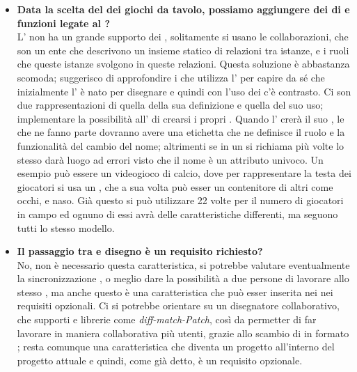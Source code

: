 \begin{itemize}
	   	\item 
	   		\textbf{Data la scelta del  dei giochi da tavolo, possiamo aggiungere dei  di  e funzioni legate al ?} \\
	    	\justifying     		
L' non ha un grande supporto dei , solitamente si usano le collaborazioni, che son un ente che descrivono un insieme statico di relazioni tra istanze, e i ruoli che queste istanze svolgono in queste relazioni. Questa soluzione è abbastanza scomoda; suggerisco di approfondire i  che utilizza l' per capire da sé che inizialmente l' è nato per disegnare  e quindi con l'uso dei  c'è contrasto. 
Ci son due rappresentazioni di  quella della sua definizione e quella del suo uso; implementare la possibilità all' di crearsi i propri . Quando l' crerà il suo , le  che ne fanno parte dovranno avere una etichetta che ne definisce il ruolo e la funzionalità del cambio del nome; altrimenti se in un  si richiama più volte lo stesso  darà luogo ad errori visto che il nome è un attributo univoco. Un esempio può essere un videogioco di calcio, dove per rappresentare la testa dei giocatori si usa un , che a sua volta può esser un contenitore di altri  come occhi, e naso. Già questo  si può utilizzare 22 volte per il numero di giocatori in campo ed ognuno di essi avrà delle caratteristiche differenti, ma seguono tutti lo stesso modello.
\\
	  		   	\item 
	   		\textbf{Il passaggio tra  e disegno è un requisito richiesto?} \\
	    	\justifying     		
No, non è necessario questa caratteristica, si potrebbe valutare eventualmente la sincronizzazione , o meglio dare la possibilità a due persone di lavorare allo stesso  , ma anche questo è una caratteristica che può esser inserita nei nei requisiti opzionali. Ci si potrebbe orientare su un disegnatore collaborativo, che supporti  e librerie come \emph{diff-match-Patch}, così da permetter di far lavorare in maniera collaborativa più utenti, grazie allo scambio di  in formato ; resta comunque una caratteristica che diventa un progetto all'interno del progetto attuale e quindi, come già detto, è un requisito opzionale.

\end{itemize}
